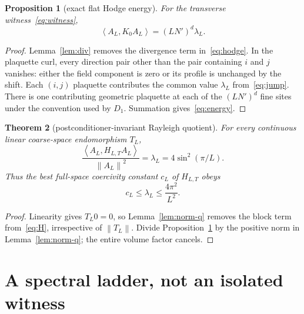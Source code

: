 \documentclass[11pt]{article}
\newtheorem{theorem}{Theorem}[section]
\newtheorem{proposition}[theorem]{Proposition}
\theoremstyle{definition}
\newcommand{\ip}[2]{\left\langle #1,#2\right\rangle}
\newcommand{\norm}[1]{\left\lVert #1\right\rVert}
\begin{document}
\begin{proposition}[exact flat Hodge energy]\label{prop:energy}
For the transverse witness~\eqref{eq:witness},
\begin{equation}\label{eq:energy}
 \ip{A_L}{K_0A_L}=(LN')^d\lambda_L.
\end{equation}
\end{proposition}

\begin{proof}
Lemma~\ref{lem:div} removes the divergence term in~\eqref{eq:hodge}.  In the
plaquette curl, every direction pair other than the pair containing $i$ and
$j$ vanishes: either the field component is zero or its profile is unchanged
by the shift.  Each $(i,j)$ plaquette contributes the common value
$\lambda_L$ from~\eqref{eq:jump}.  There is one contributing geometric
plaquette at each of the $(LN')^d$ fine sites under the convention used by
$D_1$.  Summation gives~\eqref{eq:energy}.
\end{proof}

\begin{theorem}[postconditioner-invariant Rayleigh quotient]\label{thm:rayleigh}
For every continuous linear coarse-space endomorphism $T_L$,
\begin{equation}\label{eq:rayleigh}
 \frac{\ip{A_L}{H_{L,T}A_L}}{\norm{A_L}^2}
 =\lambda_L=4\sin^2(\pi/L).
\end{equation}
Thus the best full-space coercivity constant $c_L$ of $H_{L,T}$ obeys
\begin{equation}\label{eq:coerc-upper}
 c_L\le\lambda_L\le\frac{4\pi^2}{L^2}.
\end{equation}
\end{theorem}

\begin{proof}
Linearity gives $T_L0=0$, so Lemma~\ref{lem:norm-q} removes the block term
from~\eqref{eq:H}, irrespective of $\norm{T_L}$.  Divide
Proposition~\ref{prop:energy} by the positive norm in
Lemma~\ref{lem:norm-q}; the entire volume factor cancels.
\end{proof}

\section{A spectral ladder, not an isolated witness}
\end{document}
